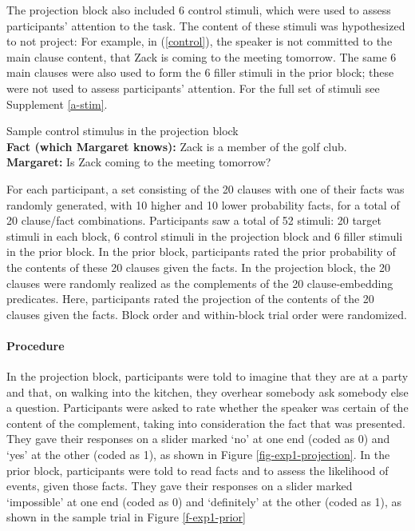 \documentclass[11pt,fleqn]{article}
\newcommand{\6}{\mbox{$[\hspace*{-.6mm}[$}}
\newcommand{\9}{\mbox{$]\hspace*{-.6mm}]$}}
\begin{document}
The projection block also included 6 control stimuli, which were used to assess participants' attention to the task. The content of these stimuli was hypothesized to not project: For example, in (\ref{control}), the speaker is not committed to the main clause content, that Zack is coming to the meeting tomorrow. %
The same 6 main clauses were also used to form the 6 filler stimuli in the prior block; these were not used to assess participants' attention. For the full set of stimuli see Supplement \ref{a-stim}.

\begin{exe}
\ex\label{control} Sample control stimulus in the projection block \\ {\bf Fact (which Margaret knows):}  Zack is a member of the golf club. \\ {\bf Margaret:} Is Zack coming to the meeting tomorrow?
\end{exe}


For each participant, a set consisting of the 20 clauses with one of their facts was randomly generated, with 10 higher and 10 lower probability facts, for a total of 20 clause/fact combinations. Participants saw a total of 52 stimuli: 20 target stimuli in each block, 6 control stimuli in the projection block and 6 filler stimuli in the prior block. In the prior block, participants rated the prior probability of the contents of these 20 clauses given the facts. In the projection block, the 20 clauses were randomly realized as the complements of the 20 clause-embedding predicates. Here, participants rated the projection of the contents of the 20 clauses given the facts. Block order and within-block trial order were randomized.

\paragraph{Procedure} In the projection block, participants were told to imagine that they are at a party and that, on walking into the kitchen, they overhear somebody ask somebody else a question. Participants were asked to rate whether the speaker was certain of the content of the complement, taking into consideration the fact that was presented. They gave their responses on a slider marked `no' at one end (coded as 0) and `yes' at the other (coded as 1), as shown in Figure \ref{fig-exp1-projection}. In the prior block, participants were told to read facts and to assess the likelihood of events, given those facts. They gave their responses on a slider marked `impossible' at one end (coded as 0) and `definitely' at the other (coded as 1), as shown in the sample trial in Figure \ref{f-exp1-prior}
\end{document}

